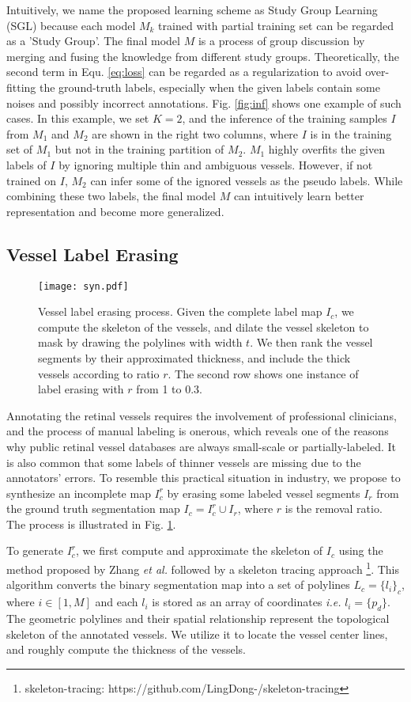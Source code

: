 \documentclass[runningheads]{llncs}
\newcommand{\etal}{\textit{et al.}}
\begin{document}
Intuitively, we name the proposed learning scheme as Study Group Learning (SGL) because each model $M_k$ trained with partial training set can be regarded as a 'Study Group'. The final model $M$ is a process of group discussion by merging and fusing the knowledge from different study groups. Theoretically, the second term in Equ. \ref{eq:loss} can be regarded as a regularization to avoid over-fitting the ground-truth labels, especially when the given labels contain some noises and possibly incorrect annotations. Fig. \ref{fig:inf} shows one example of such cases. In this example, we set $K=2$, and the inference of the training samples $I$ from $M_1$ and $M_2$ are shown in the right two columns, where $I$ is in the training set of $M_1$ but not in the training partition of $M_2$. $M_1$ highly overfits the given labels of $I$ by ignoring multiple thin and ambiguous vessels. However, if not trained on $I$, $M_2$ can infer some of the ignored vessels as the pseudo labels. While combining these two labels, the final model $M$ can intuitively learn better representation and become more generalized. 

\subsection{Vessel Label Erasing}
\begin{figure}[t]\centering
\texttt{[image: syn.pdf]}
\caption{Vessel label erasing process. Given the complete label map $I_c$, we compute the skeleton of the vessels, and dilate the vessel skeleton to mask by drawing the polylines with width $t$. We then rank the vessel segments by their approximated thickness, and include the thick vessels according to ratio $r$. The second row shows one instance of label erasing with $r$ from 1 to 0.3.}
\label{fig:synp}
\end{figure}
Annotating the retinal vessels requires the involvement of professional clinicians, and the process of manual labeling is onerous, which reveals one of the reasons why public retinal vessel databases are always small-scale or partially-labeled. It is also common that some labels of thinner vessels are missing due to the annotators' errors. To resemble this practical situation in industry, we propose to synthesize an incomplete map ${I_c^r}$ by erasing some labeled vessel segments $I_r$ from the ground truth segmentation map $I_c = I_c^r \cup I_r$, where $r$ is the removal ratio. The process is illustrated in Fig. \ref{fig:synp}.

To generate $I_c^r$, we first compute and approximate the skeleton of $I_c$ using the method proposed by Zhang \etal \cite{zhang1984fast} followed by a skeleton tracing approach \footnote{skeleton-tracing: https://github.com/LingDong-/skeleton-tracing}. This algorithm converts the binary segmentation map into a set of polylines $L_c = \{l_i\}_c$, where $i \in [1, M]$ and each $l_i$ is stored as an array of coordinates \textit{i.e.} ${l_i = \{p_d\}}$. The geometric polylines and their spatial relationship represent the topological skeleton of the annotated vessels. We utilize it to locate the vessel center lines, and roughly compute the thickness of the vessels. 
\end{document}
